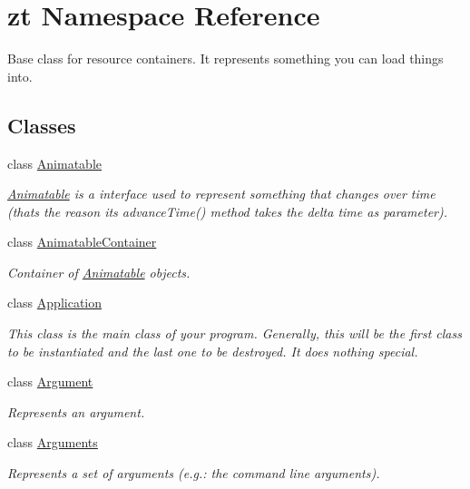 \hypertarget{namespacezt}{}\section{zt Namespace Reference}
\label{namespacezt}


Base class for resource containers. It represents something you can load things into.  


\subsection*{Classes}
\begin{DoxyCompactItemize}
\item 
class \hyperlink{classzt_1_1_animatable}{Animatable}
\begin{DoxyCompactList}\small\item\em \hyperlink{classzt_1_1_animatable}{Animatable} is a interface used to represent something that changes over time (that\textquotesingle{}s the reason its advance\+Time() method takes the delta time as parameter). \end{DoxyCompactList}\item 
class \hyperlink{classzt_1_1_animatable_container}{Animatable\+Container}
\begin{DoxyCompactList}\small\item\em Container of \hyperlink{classzt_1_1_animatable}{Animatable} objects. \end{DoxyCompactList}\item 
class \hyperlink{classzt_1_1_application}{Application}
\begin{DoxyCompactList}\small\item\em This class is the main class of your program. Generally, this will be the first class to be instantiated and the last one to be destroyed. It does nothing special. \end{DoxyCompactList}\item 
class \hyperlink{classzt_1_1_argument}{Argument}
\begin{DoxyCompactList}\small\item\em Represents an argument. \end{DoxyCompactList}\item 
class \hyperlink{classzt_1_1_arguments}{Arguments}
\begin{DoxyCompactList}\small\item\em Represents a set of arguments (e.\+g.\+: the command line arguments). \end{DoxyCompactList}\item 

\end{DoxyCompactItemize}
